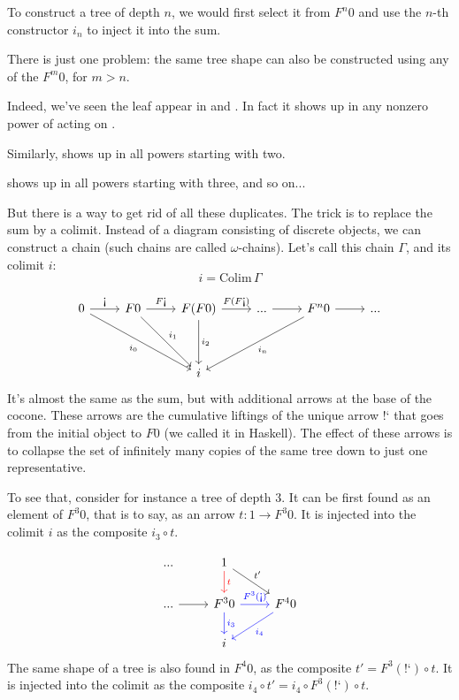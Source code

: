 \documentclass[DaoFP]{subfiles}
\begin{document}
To construct a tree of depth $n$, we would first select it from $F^n 0$ and use the $n$-th constructor $i_n$ to inject it into the sum. 

There is just one problem: the same tree shape can also be constructed using any of the $F^m 0$, for $m > n$. 

Indeed, we've seen the leaf  appear in  and . In fact it shows up in any nonzero power of  acting on . 

Similarly,  shows up in all powers starting with two.

 shows up in all powers starting with three, and so on...

But there is a way to get rid of all these duplicates. The trick is to replace the sum by a colimit. Instead of a diagram consisting of discrete objects, we can construct a chain (such chains are called $\omega$-chains). Let's call this chain $\Gamma$, and its colimit $i$:
\[i = \text{Colim} \, \Gamma \]

\[
 \begin{tikzcd}
 0
 \arrow[r, "\mbox{!`}"]
 \arrow[ddrr, "i_0"']
 & F 0
  \arrow[r, "F\mbox{!`}"]
 \arrow[ddr, "i_1"]
& F (F 0)
  \arrow[r, "F(F\mbox{!`})"]
  \arrow[dd, "i_2"]
 & ...
 \arrow[r]
 & F^n 0
  \arrow[r]
 \arrow[ddll, "i_n"]
 & ...
 \\
 \\
 &&i
  \end{tikzcd}
\]
It's almost the same as the sum, but with additional arrows at the base of the cocone. These arrows are the cumulative liftings of the unique arrow $\mbox{!`}$ that goes from the initial object to $F 0$ (we called it  in Haskell). The effect of these arrows is to collapse the set of infinitely many copies of the same tree down to just one representative. 

To see that, consider for instance a tree of depth $3$. It can be first found as an element of $F^3 0$, that is to say, as an arrow $t \colon 1 \to F^3 0$. It is injected into the colimit $i$ as the composite $i_3 \circ t$. 

\[
 \begin{tikzcd}
 ...
& 1
\arrow[d, red, "t"]
\arrow[dr, "t'"]
 \\
 ...
 \arrow[r]
 & F^3 0 
 \arrow[r,  blue, "F^3 (\mbox{!`})"]
 \arrow[d, blue, "i_3"]
 & F^4 0
 \arrow[dl, blue, "i_4"]
 \\
 &  i
  \end{tikzcd}
\]
The same shape of a tree is also found in $F^4 0$, as the composite $t' = F^3 (\mbox{!`}) \circ t$. It is injected into the colimit as the composite $i_4 \circ t' = i_4 \circ F^3 (\mbox{!`}) \circ t$. 
\end{document}
